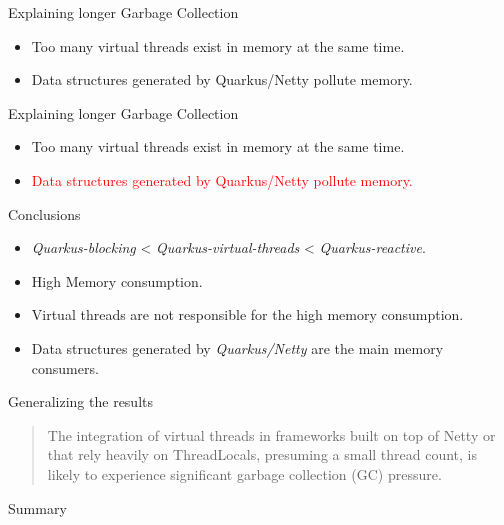 \documentclass{beamer}
\begin{document}
\begin{frame}{Explaining longer Garbage Collection}
    \begin{itemize}
        \item Too many virtual threads exist in memory at the same time.   
        \item Data structures generated by Quarkus/Netty pollute memory.
    \end{itemize}
\end{frame}
\begin{frame}{Explaining longer Garbage Collection}
    \begin{itemize}
        \item Too many virtual threads exist in memory at the same time.   
        \item \textcolor{red}{Data structures generated by Quarkus/Netty pollute memory.}
    \end{itemize}
\end{frame}
\begin{frame}{Conclusions}
    \begin{itemize}
        \item \emph{Quarkus-blocking} < \emph{Quarkus-virtual-threads}  < \emph{Quarkus-reactive}.
        \item High Memory consumption.
        \item Virtual threads are not responsible for the high memory consumption.
        \item Data structures generated by \emph{Quarkus/Netty} are the main memory consumers.
    \end{itemize}
\end{frame}
\begin{frame}{Generalizing the results}
    \begin{quote}
        The integration of virtual threads in frameworks built on top of Netty or that rely heavily on ThreadLocals, presuming a small thread count, is likely to experience significant garbage collection (GC) pressure.
    \end{quote}
\end{frame}
\begin{frame}{Summary}

\end{frame}
\end{document}
